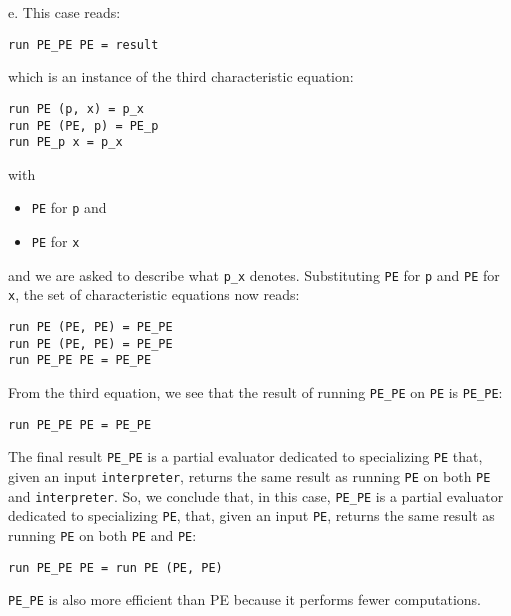 \documentclass{article}
\begin{document}
e. This case reads:
\begin{lstlisting}
run PE_PE PE = result
\end{lstlisting}
which is an instance of the third characteristic equation:
\begin{lstlisting}
run PE (p, x) = p_x
run PE (PE, p) = PE_p
run PE_p x = p_x
\end{lstlisting}
with
\begin{itemize}
    \item \verb+PE+ for \verb+p+ and
    \item \verb+PE+ for \verb+x+
\end{itemize}
and we are asked to describe what \verb+p_x+ denotes. \linebreak
Substituting \verb+PE+ for \verb+p+ and \verb+PE+ for \verb+x+, the set of characteristic equations now reads:
\begin{lstlisting}
run PE (PE, PE) = PE_PE
run PE (PE, PE) = PE_PE
run PE_PE PE = PE_PE
\end{lstlisting}
From the third equation, we see that the result of running \verb+PE_PE+ on \verb+PE+ is \verb+PE_PE+:
\begin{lstlisting}
run PE_PE PE = PE_PE
\end{lstlisting}
The final result \verb+PE_PE+ is a partial evaluator dedicated to specializing \verb+PE+ that, given an input \verb+interpreter+, returns the same result as running \verb+PE+ on both \verb+PE+ and \verb+interpreter+.\linebreak
So, we conclude that, in this case, \verb+PE_PE+ is a partial evaluator dedicated to specializing \verb+PE+, that, given an input \verb+PE+, returns the same result as running \verb+PE+ on both \verb+PE+ and \verb+PE+:
\begin{lstlisting}
run PE_PE PE = run PE (PE, PE)
\end{lstlisting}
\verb+PE_PE+ is also more efficient than PE because it performs fewer computations.

\newpage
\end{document}
